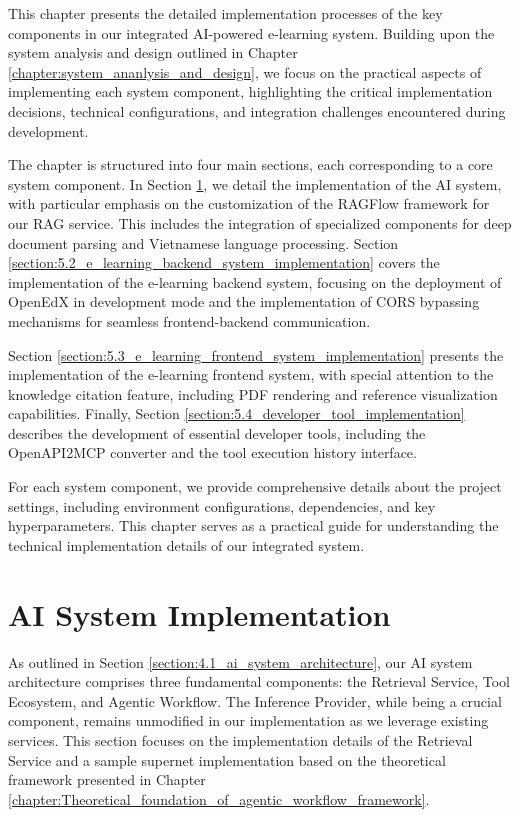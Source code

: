 \documentclass[../Main.tex]{subfiles}
\begin{document}
This chapter presents the detailed implementation processes of the key components in our integrated AI-powered e-learning system. Building upon the system analysis and design outlined in Chapter \ref{chapter:system_ananlysis_and_design}, we focus on the practical aspects of implementing each system component, highlighting the critical implementation decisions, technical configurations, and integration challenges encountered during development.

The chapter is structured into four main sections, each corresponding to a core system component. In Section \ref{section:5.1_ai_system_implementation}, we detail the implementation of the AI system, with particular emphasis on the customization of the RAGFlow framework for our RAG service. This includes the integration of specialized components for deep document parsing and Vietnamese language processing. Section \ref{section:5.2_e_learning_backend_system_implementation} covers the implementation of the e-learning backend system, focusing on the deployment of OpenEdX in development mode and the implementation of CORS bypassing mechanisms for seamless frontend-backend communication.

Section \ref{section:5.3_e_learning_frontend_system_implementation} presents the implementation of the e-learning frontend system, with special attention to the knowledge citation feature, including PDF rendering and reference visualization capabilities. Finally, Section \ref{section:5.4_developer_tool_implementation} describes the development of essential developer tools, including the OpenAPI2MCP converter and the tool execution history interface.

For each system component, we provide comprehensive details about the project settings, including environment configurations, dependencies, and key hyperparameters. This chapter serves as a practical guide for understanding the technical implementation details of our integrated system.

\section{AI System Implementation}
\label{section:5.1_ai_system_implementation}

As outlined in Section \ref{section:4.1_ai_system_architecture}, our AI system architecture comprises three fundamental components: the Retrieval Service, Tool Ecosystem, and Agentic Workflow. The Inference Provider, while being a crucial component, remains unmodified in our implementation as we leverage existing services. This section focuses on the implementation details of the Retrieval Service and a sample supernet implementation based on the theoretical framework presented in Chapter \ref{chapter:Theoretical_foundation_of_agentic_workflow_framework}.
\end{document}
